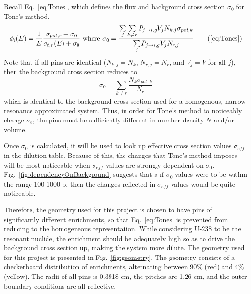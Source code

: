 \documentclass[10pt]{article}
\begin{document}
Recall Eq.~\ref{eq:Tones}, which defines the flux and background cross section $\sigma_0$ for Tone's method.
\begin{equation*}\phi_i(E)=\frac{1}{E}\frac{\sigma_{pot,r}+\sigma_{0}}{\sigma_{t,r}(E)+\sigma_{0}}~\mbox{where }\sigma_{0}=\frac{\sum\limits_j\sum\limits_{k\neq r}P_{j\rightarrow i,g}V_{j}N_{k,j}\sigma_{pot,k}}{\sum\limits_jP_{j\rightarrow i,g}V_{j}N_{r,j}}\tag{\ref{eq:Tones}}\end{equation*}
  Note that if all pins are identical ($N_{k,j}=N_k$, $N_{r,j}=N_r$, and $V_j=V$ for all $j$), then the background cross section reduces to 
  \begin{equation}\sigma_0=\sum\limits_{k\neq r}\frac{N_k\sigma_{pot,k}}{N_r}\end{equation}
    which is identical to the background cross section used for a homogenous, narrow resonance approximated system. Thus, in order for Tone's method to noticeably change $\sigma_0$, the pins must be sufficiently different in number density $N$ and/or volume. \par
    Once $\sigma_0$ is calculated, it will be used to look up effective cross section values $\sigma_{eff}$ in the dilution table. Because of this, the changes that Tone's method imposes will be most noticeable when $\sigma_{eff}$ values are strongly dependent on $\sigma_0$. Fig.~\ref{fig:dependencyOnBackground} suggests that a if $\sigma_0$ values were to be within the range 100-1000 b, then the changes reflected in $\sigma_{eff}$ values would be quite noticeable.\par
    Therefore, the geometry used for this project is chosen to have pins of significantly different enrichments, so that Eq.~\ref{eq:Tones} is prevented from reducing to the homogeneous representation. While considering U-238 to be the resonant nuclide, the enrichment should be adequately high so as to drive the background cross section up, making the system more dilute. The geometry used for this project is presented in Fig.~\ref{fig:geometry}. The geometry consists of a checkerboard distribution of enrichments, alternating between 90\% (red) and 4\% (yellow). The radii of all pins is 0.3918 cm, the pitches are 1.26 cm, and the outer boundary conditions are all reflective.
    
\end{document}
